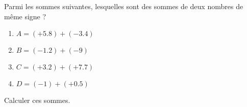 
\begin{exercice}\label{exosmath-0722}

Parmi les sommes suivantes, lesquelles sont des sommes de deux nombres de même signe ?
\begin{enumerate}
    \item
        \( A=(+5.8)+(-3.4)\)
    \item
        \( B=(-1.2)+(-9)\)
    \item
        \( C=(+3.2)+(+7.7)\)
    \item
        \( D=(-1)+(+0.5)\)
\end{enumerate}
Calculer ces sommes.

\end{exercice}
